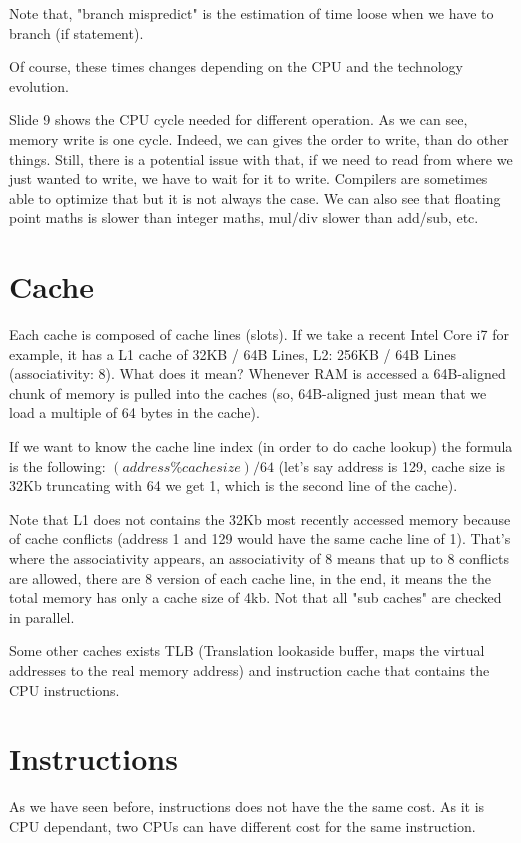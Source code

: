 Note that, "branch mispredict" is the estimation of time loose when we have to
branch (if statement). 

Of course, these times changes depending on the CPU and the technology
evolution.

Slide 9 shows the CPU cycle needed for different operation. As we can see,
memory write is one cycle. Indeed, we can gives the order to write, than do
other things. Still, there is a potential issue with that, if we need to read
from where we just wanted to write, we have to wait for it to write. Compilers
are sometimes able to optimize that but it is not always the case. We can also
see that floating point maths is slower than integer maths, mul/div slower than
add/sub, etc.

\section{Cache}
Each cache is composed of cache lines (slots). If we take a recent Intel Core i7
for example, it has a L1 cache of 32KB / 64B Lines, L2: 256KB / 64B Lines
(associativity: 8). What does it mean? Whenever RAM is accessed a 64B-aligned
chunk of memory is pulled into the caches (so, 64B-aligned just mean that we
load a multiple of 64 bytes in the cache). 

If we want to know the cache line index (in order to do cache lookup) the
formula is the following: $(address \% cache size) / 64$ (let's say address is
129, cache size is 32Kb truncating with 64 we get 1, which is the second line of
the cache).

Note that L1 does not contains the 32Kb most recently accessed memory because of
cache conflicts (address 1 and 129 would have the same cache line of 1). That's
where the associativity appears, an associativity of 8 means that up to 8
conflicts are allowed, there are 8 version of each cache line, in the end, it
means the the total memory has only a cache size of 4kb. Not that all "sub
caches" are checked in parallel.


Some other caches exists TLB (Translation lookaside buffer, maps the virtual
addresses to the real memory address) and instruction cache that contains the
CPU instructions.

\section{Instructions}
As we have seen before, instructions does not have the the same cost. As it is
CPU dependant, two CPUs can have different cost for the same instruction.

